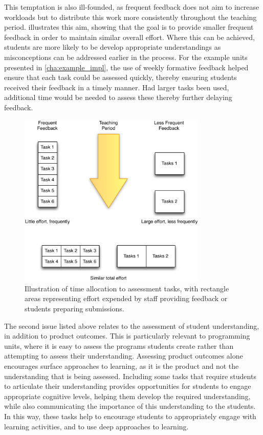 This temptation is also ill-founded, as frequent feedback does not aim to increase workloads but to distribute this work more consistently throughout the teaching period.  illustrates this aim, showing that the goal is to provide smaller frequent feedback in order to maintain similar overall effort. Where this can be achieved, students are more likely to be develop appropriate understandings as misconceptions can be addressed earlier in the process. For the example units presented in \cref{cha:example_impl}, the use of weekly formative feedback helped ensure that each task could be assessed quickly, thereby ensuring students received their feedback in a timely manner. Had larger tasks been used, additional time would be needed to assess these thereby further delaying feedback.

\begin{figure}[htbp]
	\centering
	\includegraphics[width=0.8\textwidth]{FormativeFeedback}
	\caption{Illustration of time allocation to assessment tasks, with rectangle areas representing effort expended by staff providing feedback or students preparing submissions.}
	\label{fig:formative_feedback}
\end{figure}

The second issue listed above relates to the assessment of student understanding, in addition to product outcomes. This is particularly relevant to programming units, where it is easy to assess the programs students create rather than attempting to assess their understanding. Assessing product outcomes alone encourages surface approaches to learning, as it is the product and not the understanding that is being assessed. Including some tasks that require students to articulate their understanding provides opportunities for students to engage appropriate cognitive levels, helping them develop the required understanding, while also communicating the importance of this understanding to the students. In this way, these tasks help to encourage students to appropriately engage with learning activities, and to use deep approaches to learning.

